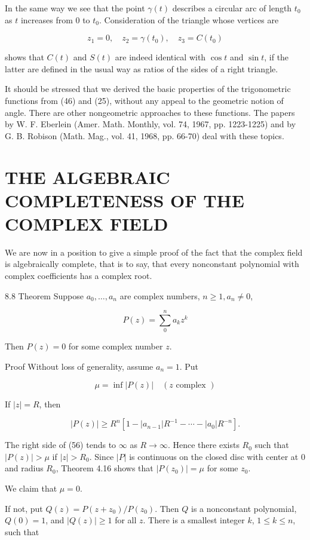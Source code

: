 \documentclass[10pt]{article}
\begin{document}
In the same way we see that the point $\gamma(t)$ describes a circular arc of length $t_{0}$ as $t$ increases from 0 to $t_{0}$. Consideration of the triangle whose vertices are

$$
z_{1}=0, \quad z_{2}=\gamma\left(t_{0}\right), \quad z_{3}=C\left(t_{0}\right)
$$

shows that $C(t)$ and $S(t)$ are indeed identical with $\cos t$ and $\sin t$, if the latter are defined in the usual way as ratios of the sides of a right triangle.

It should be stressed that we derived the basic properties of the trigonometric functions from (46) and (25), without any appeal to the geometric notion of angle. There are other nongeometric approaches to these functions. The papers by W. F. Eberlein (Amer. Math. Monthly, vol. 74, 1967, pp. 1223-1225) and by G. B. Robison (Math. Mag., vol. 41, 1968, pp. 66-70) deal with these topics.

\section{THE ALGEBRAIC COMPLETENESS OF THE COMPLEX FIELD}
We are now in a position to give a simple proof of the fact that the complex field is algebraically complete, that is to say, that every nonconstant polynomial with complex coefficients has a complex root.

8.8 Theorem Suppose $a_{0}, \ldots, a_{n}$ are complex numbers, $n \geq 1, a_{n} \neq 0$,

$$
P(z)=\sum_{0}^{n} a_{k} z^{k}
$$

Then $P(z)=0$ for some complex number $z$.

Proof Without loss of generality, assume $a_{n}=1$. Put

$$
\mu=\inf |P(z)| \quad(z \text { complex })
$$

If $|z|=R$, then

$$
|P(z)| \geq R^{n}\left[1-\left|a_{n-1}\right| R^{-1}-\cdots-\left|a_{0}\right| R^{-n}\right] .
$$

The right side of (56) tends to $\infty$ as $R \rightarrow \infty$. Hence there exists $R_{0}$ such that $|P(z)|>\mu$ if $|z|>R_{0}$. Since $|P|$ is continuous on the closed disc with center at 0 and radius $R_{0}$, Theorem 4.16 shows that $\left|P\left(z_{0}\right)\right|=\mu$ for some $z_{0}$.

We claim that $\mu=0$.

If not, put $Q(z)=P\left(z+z_{0}\right) / P\left(z_{0}\right)$. Then $Q$ is a nonconstant polynomial, $Q(0)=1$, and $|Q(z)| \geq 1$ for all $z$. There is a smallest integer $k$, $1 \leq k \leq n$, such that
\end{document}
